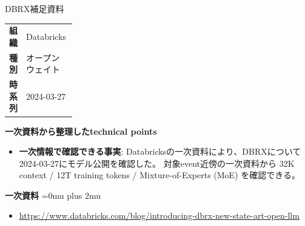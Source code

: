 \Needspace{0.38\textheight}
\begin{technicalnote}{DBRX}{補足資料}
\begingroup
\begin{tabularx}{\linewidth}{@{}>{\bfseries}p{0.22\linewidth}X@{}}
組織 & Databricks \\
種別 & オープンウェイト \\
時系列 & 2024-03-27 \\
\end{tabularx}
\smallskip
\begin{minipage}{\linewidth}
{\bfseries 一次資料から整理したtechnical points}
\begin{itemize}[leftmargin=1.5em,itemsep=0.35em]
\item \textbf{一次情報で確認できる事実}: Databricksの一次資料により、DBRXについて2024-03-27にモデル公開を確認した。 対象event近傍の一次資料から 32K context / 12T training tokens / Mixture-of-Experts (MoE) を確認できる。
\end{itemize}
\begin{minipage}{\linewidth}
\begin{samepage}
{\bfseries 一次資料}
\begingroup\sloppy
\Urlmuskip=0mu plus 2mu\relax
\begin{itemize}[leftmargin=1.5em,itemsep=0.25em]
\item {\scriptsize\url{https://www.databricks.com/blog/introducing-dbrx-new-state-art-open-llm}}
\end{itemize}
\endgroup
\end{samepage}
\end{minipage}
\end{minipage}
\endgroup
\end{technicalnote}
\medskip

